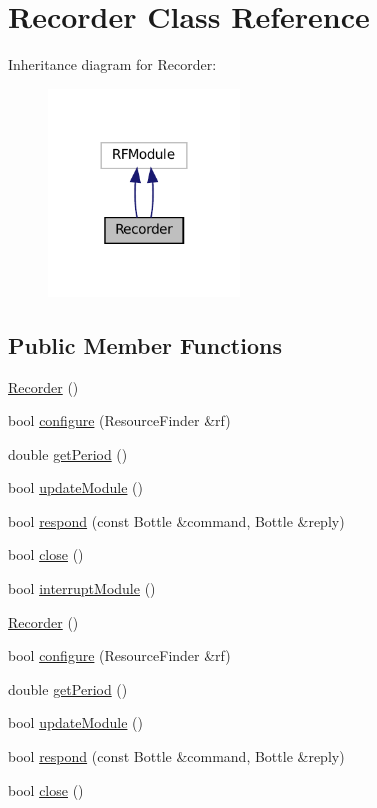 \hypertarget{classRecorder}{}\section{Recorder Class Reference}
\label{classRecorder}


Inheritance diagram for Recorder\+:
\nopagebreak
\begin{figure}[H]
\begin{center}
\leavevmode
\includegraphics[width=144pt]{classRecorder__inherit__graph}
\end{center}
\end{figure}
\subsection*{Public Member Functions}
\begin{DoxyCompactItemize}
\item 
\hyperlink{classRecorder_af0b4f40e7c67f16b0ffff13712149d78}{Recorder} ()
\item 
bool \hyperlink{classRecorder_a4d808e388c2c8369c253cfbb7bd574cf}{configure} (Resource\+Finder \&rf)
\item 
double \hyperlink{classRecorder_a3dd6aca1931c7dd4dba6b61590641b00}{get\+Period} ()
\item 
bool \hyperlink{classRecorder_a0689f290ac7e49caabe3926fbd703b12}{update\+Module} ()
\item 
bool \hyperlink{classRecorder_adfaba3907e14d55a702b3935d894d1f1}{respond} (const Bottle \&command, Bottle \&reply)
\item 
bool \hyperlink{classRecorder_a25b5d0cb6f7e7c591cabb0b34ebc81e2}{close} ()
\item 
bool \hyperlink{classRecorder_acaea9fb8ce689c0e6fdfdd451c42e391}{interrupt\+Module} ()
\item 
\hyperlink{classRecorder_af0b4f40e7c67f16b0ffff13712149d78}{Recorder} ()
\item 
bool \hyperlink{classRecorder_a4d808e388c2c8369c253cfbb7bd574cf}{configure} (Resource\+Finder \&rf)
\item 
double \hyperlink{classRecorder_a3dd6aca1931c7dd4dba6b61590641b00}{get\+Period} ()
\item 
bool \hyperlink{classRecorder_a0689f290ac7e49caabe3926fbd703b12}{update\+Module} ()
\item 
bool \hyperlink{classRecorder_adfaba3907e14d55a702b3935d894d1f1}{respond} (const Bottle \&command, Bottle \&reply)
\item 
bool \hyperlink{classRecorder_a25b5d0cb6f7e7c591cabb0b34ebc81e2}{close} ()
\end{DoxyCompactItemize}


